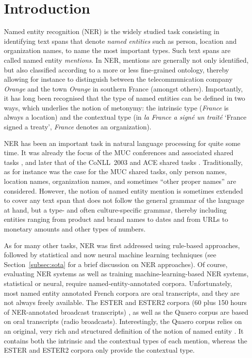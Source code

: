 \section{Introduction}
\label{sec:intro}

Named entity recognition (NER) is the widely studied task consisting in identifying text spans that denote \emph{named entities} such as person, location and organization names, to name the most important types. Such text spans are called named entity \emph{mentions}. In NER, mentions are generally not only identified, but also classified according to a more or less fine-grained ontology, thereby allowing for instance to distinguish between the telecommunication company \emph{Orange} and the town \emph{Orange} in southern France (amongst others). Importantly, it has long been recognised that the type of named entities can be defined in two ways, which underlies the notion of metonymy: the intrinsic type (\emph{France} is always a location) and the contextual type (in \emph{la France a signé un traité} `France signed a treaty', \emph{France} denotes an organization).


NER has been an important task in natural language processing for quite some time. It was already the focus of the MUC conferences and associated shared tasks
\cite{marsh-perzanowski-1998-muc}, and later that of the CoNLL~2003 and ACE shared tasks \cite{tjong-kim-sang-de-meulder-2003-introduction,doddington-etal-2004-automatic}. Traditionally, as for instance was the case for the MUC shared tasks, only person names, location names, organization names, and sometimes ``other proper names'' are considered. However, the notion of named entity mention is sometimes extended to cover any text span that does not follow the general grammar of the language at hand, but a type- and often culture-specific grammar, thereby including entities ranging from product and brand names to dates and from URLs to monetary amounts and other types of numbers.

As for many other tasks, NER was first addressed using rule-based approaches, followed by statistical and now neural machine learning techniques (see Section~\ref{subsec:sota} for a brief discussion on NER approaches). Of course, evaluating NER systems as well as training machine-learning-based NER systems, statistical or neural, require named-entity-annotated corpora.
Unfortunately, most named entity annotated French corpora are oral transcripts, and they are not always freely available. The ESTER and ESTER2 corpora (60 plus 150 hours of NER-annotated broadcast transcripts)
\cite{galliano-etal-2005-the,galliano-etal-2009-the}, as well as the Quaero
\cite{grouin-etal-2011-proposal} corpus are based on oral transcripts (radio broadcasts). Interestingly, the Quaero corpus relies on an original, very rich and structured  definition of the notion of named entity \cite{rosset-etal-2011-entites}. It contains both the intrinsic and the contextual types of each mention, whereas the ESTER and ESTER2 corpora only provide the contextual type.

